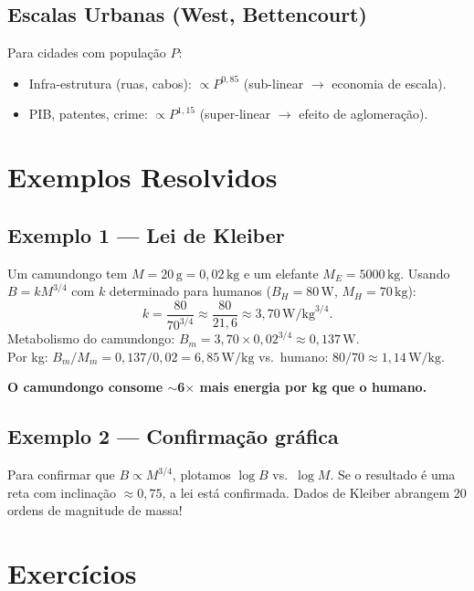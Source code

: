 \documentclass[12pt,a4paper]{article}
\begin{document}
\subsection*{Escalas Urbanas (West, Bettencourt)}
Para cidades com popula\c{c}\~ao $P$:
\begin{itemize}
  \item Infra-estrutura (ruas, cabos): $\propto P^{0{,}85}$ (sub-linear $\to$ economia de escala).
  \item PIB, patentes, crime: $\propto P^{1{,}15}$ (super-linear $\to$ efeito de aglomera\c{c}\~ao).
\end{itemize}

\section*{Exemplos Resolvidos}

\subsection*{Exemplo 1 --- Lei de Kleiber}
Um camundongo tem $M = 20\,\text{g} = 0{,}02\,\text{kg}$ e um elefante $M_E = 5000\,\text{kg}$. Usando $B = k M^{3/4}$ com $k$ determinado para humanos ($B_H = 80\,\text{W}$, $M_H = 70\,\text{kg}$):
\[
k = \frac{80}{70^{3/4}} \approx \frac{80}{21{,}6} \approx 3{,}70\,\text{W/kg}^{3/4}.
\]
Metabolismo do camundongo: $B_m = 3{,}70 \times 0{,}02^{3/4} \approx 0{,}137\,\text{W}$.\\
Por kg: $B_m/M_m = 0{,}137/0{,}02 = 6{,}85\,\text{W/kg}$ vs.\ humano: $80/70 \approx 1{,}14\,\text{W/kg}$.

\textbf{O camundongo consome $\sim$6$\times$ mais energia por kg que o humano.}

\subsection*{Exemplo 2 --- Confirma\c{c}\~ao gr\'afica}
Para confirmar que $B \propto M^{3/4}$, plotamos $\log B$ vs.\ $\log M$. Se o resultado \'e uma reta com inclin\-a\c{c}\~ao $\approx 0{,}75$, a lei est\'a confirmada. Dados de Kleiber abrangem 20 ordens de magnitude de massa!

\section*{Exerc\'icios}
\end{document}
